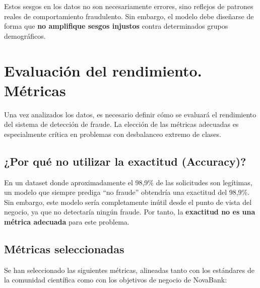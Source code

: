 \documentclass[12pt,a4paper]{report}
\begin{document}
Estos sesgos en los datos no son necesariamente errores, sino reflejos de patrones reales de comportamiento fraudulento. Sin embargo, el modelo debe diseñarse de forma que \textbf{no amplifique sesgos injustos} contra determinados grupos demográficos.

\section{Evaluación del rendimiento. Métricas}
\label{sec:h2_metricas}

Una vez analizados los datos, es necesario definir cómo se evaluará el rendimiento del sistema de detección de fraude. La elección de las métricas adecuadas es especialmente crítica en problemas con desbalanceo extremo de clases.

\subsection{¿Por qué no utilizar la exactitud (Accuracy)?}

En un dataset donde aproximadamente el 98,9\% de las solicitudes son legítimas, un modelo que siempre prediga ``no fraude'' obtendría una exactitud del 98,9\%. Sin embargo, este modelo sería completamente inútil desde el punto de vista del negocio, ya que no detectaría ningún fraude. Por tanto, la \textbf{exactitud no es una métrica adecuada} para este problema.

\subsection{Métricas seleccionadas}

Se han seleccionado las siguientes métricas, alineadas tanto con los estándares de la comunidad científica como con los objetivos de negocio de NovaBank:
\end{document}
